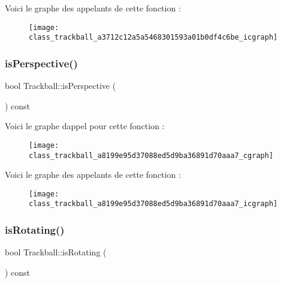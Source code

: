 Voici le graphe des appelants de cette fonction \+:\nopagebreak
\begin{figure}[H]
\begin{center}
\leavevmode
\texttt{[image: class\_trackball\_a3712c12a5a5468301593a01b0df4c6be\_icgraph]}
\end{center}
\end{figure}
\mbox{\label{class_trackball_a8199e95d37088ed5d9ba36891d70aaa7}} 
\subsubsection{\texorpdfstring{is\+Perspective()}{isPerspective()}}
{\footnotesize\ttfamily bool Trackball\+::is\+Perspective (\begin{DoxyParamCaption}{ }\end{DoxyParamCaption}) const}

Voici le graphe d\textquotesingle{}appel pour cette fonction \+:\nopagebreak
\begin{figure}[H]
\begin{center}
\leavevmode
\texttt{[image: class\_trackball\_a8199e95d37088ed5d9ba36891d70aaa7\_cgraph]}
\end{center}
\end{figure}
Voici le graphe des appelants de cette fonction \+:\nopagebreak
\begin{figure}[H]
\begin{center}
\leavevmode
\texttt{[image: class\_trackball\_a8199e95d37088ed5d9ba36891d70aaa7\_icgraph]}
\end{center}
\end{figure}
\mbox{\label{class_trackball_a78fa30a8e6ffad74df3488aa3cc009c4}} 
\subsubsection{\texorpdfstring{is\+Rotating()}{isRotating()}}
{\footnotesize\ttfamily bool Trackball\+::is\+Rotating (\begin{DoxyParamCaption}{ }\end{DoxyParamCaption}) const}

\mbox{\label{class_trackball_ab60138170269b87ee0c131a978e98c4b}} 
